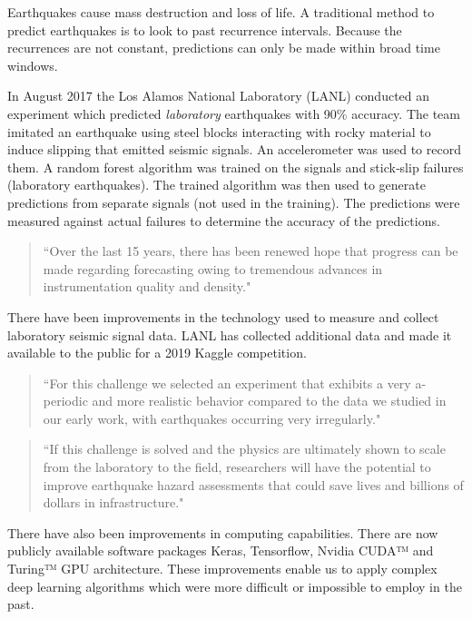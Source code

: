 \documentclass[]{llncs}
\begin{document}
Earthquakes cause mass destruction and loss of life. A traditional method to predict earthquakes is to look to past recurrence intervals. Because the recurrences are not constant, predictions can only be made within broad time windows.\par 

In August 2017 the Los Alamos National Laboratory (LANL) conducted an experiment\cite{Bertrand} which predicted \emph{laboratory} earthquakes with 90\% accuracy. The team imitated an earthquake using steel blocks interacting with rocky material to induce slipping that emitted seismic signals. An accelerometer was used to record them. A random forest algorithm was trained on the signals and stick‐slip failures (laboratory earthquakes). The trained algorithm was then used to generate predictions from separate signals (not used in the training). The predictions were measured against actual failures to determine the accuracy of the predictions\cite{LANLNews}.\par

\begin{quote}“Over the last 15 years, there has been renewed hope that progress can be made regarding forecasting owing to tremendous advances in instrumentation quality and density\cite{Bertrand}."\end{quote}

There have been improvements in the technology used to measure and collect laboratory seismic signal data. LANL has collected additional data and made it available to the public for a 2019 Kaggle competition. \par

\begin{quote}
	“For this challenge we selected an experiment that exhibits a very a-periodic and more realistic behavior compared to the data we studied in our early work, with earthquakes occurring very irregularly\cite{kaggle}." 
\end{quote}

\begin{quote}
	“If this challenge is solved and the physics are ultimately shown to scale from the laboratory to the field, researchers will have the potential to improve earthquake hazard assessments that could save lives and billions of dollars in infrastructure\cite{kaggle}."
\end{quote}

There have also been improvements in computing capabilities. There are now publicly available software packages Keras, Tensorflow, Nvidia CUDA™ and Turing™ GPU architecture. These improvements enable us to apply complex deep learning algorithms which were more difficult or impossible to employ in the past.\par
\end{document}
